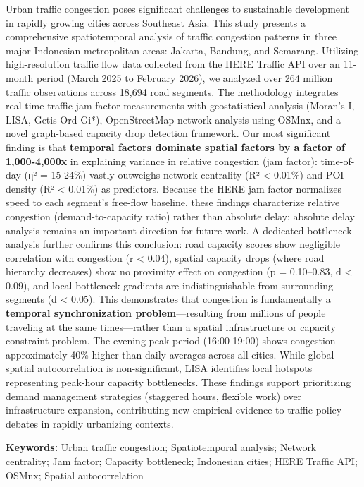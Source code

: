 \documentclass[
  12pt,
]{article}
\begin{document}
Urban traffic congestion poses significant challenges to sustainable development in rapidly growing cities across Southeast Asia. This study presents a comprehensive spatiotemporal analysis of traffic congestion patterns in three major Indonesian metropolitan areas: Jakarta, Bandung, and Semarang. Utilizing high-resolution traffic flow data collected from the HERE Traffic API over an 11-month period (March 2025 to February 2026), we analyzed over 264 million traffic observations across 18,694 road segments. The methodology integrates real-time traffic jam factor measurements with geostatistical analysis (Moran's I, LISA, Getis-Ord Gi*), OpenStreetMap network analysis using OSMnx, and a novel graph-based capacity drop detection framework. Our most significant finding is that \textbf{temporal factors dominate spatial factors by a factor of 1,000-4,000x} in explaining variance in relative congestion (jam factor): time-of-day (η² = 15-24\%) vastly outweighs network centrality (R² \textless{} 0.01\%) and POI density (R² \textless{} 0.01\%) as predictors. Because the HERE jam factor normalizes speed to each segment's free-flow baseline, these findings characterize relative congestion (demand-to-capacity ratio) rather than absolute delay; absolute delay analysis remains an important direction for future work. A dedicated bottleneck analysis further confirms this conclusion: road capacity scores show negligible correlation with congestion (r \textless{} 0.04), spatial capacity drops (where road hierarchy decreases) show no proximity effect on congestion (p = 0.10--0.83, \textbar d\textbar{} \textless{} 0.09), and local bottleneck gradients are indistinguishable from surrounding segments (\textbar d\textbar{} \textless{} 0.05). This demonstrates that congestion is fundamentally a \textbf{temporal synchronization problem}---resulting from millions of people traveling at the same times---rather than a spatial infrastructure or capacity constraint problem. The evening peak period (16:00-19:00) shows congestion approximately 40\% higher than daily averages across all cities. While global spatial autocorrelation is non-significant, LISA identifies local hotspots representing peak-hour capacity bottlenecks. These findings support prioritizing demand management strategies (staggered hours, flexible work) over infrastructure expansion, contributing new empirical evidence to traffic policy debates in rapidly urbanizing contexts.

\textbf{Keywords:} Urban traffic congestion; Spatiotemporal analysis; Network centrality; Jam factor; Capacity bottleneck; Indonesian cities; HERE Traffic API; OSMnx; Spatial autocorrelation
\end{document}

